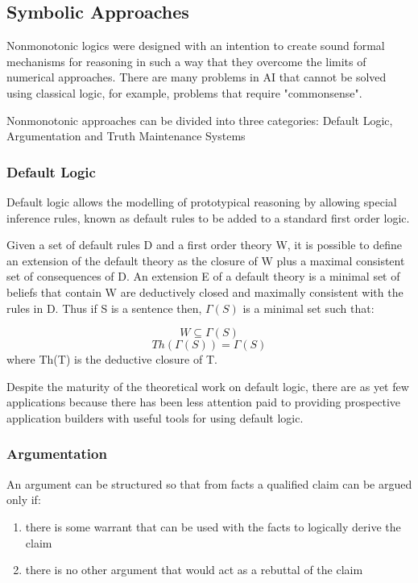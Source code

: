 \documentclass[UTF8]{article}
\begin{document}
\subsection{Symbolic Approaches}
Nonmonotonic logics were designed with an intention to create sound formal mechanisms for reasoning in such a way that they overcome the limits of numerical approaches. There are many problems in AI that cannot be solved using classical logic, for example, problems that require "commonsense".

Nonmonotonic approaches can be divided into three categories: Default Logic, Argumentation and Truth Maintenance Systems

\subsubsection{Default Logic}
Default logic allows the modelling of prototypical reasoning by allowing special inference rules, known as default rules to be added to a standard first order logic.

Given a set of default rules D and a first order theory W, it is possible to define an extension of the default theory as the closure of W plus a maximal consistent set of consequences of D. An extension E of a default theory is a minimal set of beliefs that contain W are deductively closed and maximally consistent with the rules in D. Thus if S is a sentence then, $\Gamma(S)$ is a minimal set such that:

$$
W \subseteq \Gamma(S)
$$
$$
Th(\Gamma(S)) = \Gamma(S)
$$
where Th(T) is the deductive closure of T.

Despite the maturity of the theoretical work on default logic, there are as yet few applications because there has been less attention paid to providing prospective application builders with useful tools for using default logic.
\subsubsection{Argumentation}
An argument can be structured so that from facts a qualified claim can be argued only if:
\begin{enumerate}[1]
    \item there is some warrant that can be used with the facts to logically derive the claim
    \item there is no other argument that would act as a rebuttal of the claim
\end{enumerate}
\end{document}
